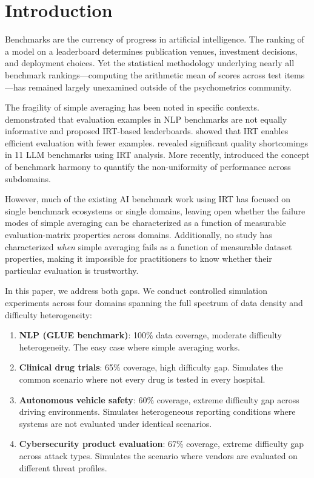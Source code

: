 \documentclass[11pt,a4paper]{article}
\begin{document}
\section{Introduction}

Benchmarks are the currency of progress in artificial intelligence. The ranking of a model on a leaderboard determines publication venues, investment decisions, and deployment choices. Yet the statistical methodology underlying nearly all benchmark rankings---computing the arithmetic mean of scores across test items---has remained largely unexamined outside of the psychometrics community.

The fragility of simple averaging has been noted in specific contexts. \citet{rodriguez2021} demonstrated that evaluation examples in NLP benchmarks are not equally informative and proposed IRT-based leaderboards. \citet{polo2024} showed that IRT enables efficient evaluation with fewer examples. \citet{zhou2025a} revealed significant quality shortcomings in 11 LLM benchmarks using IRT analysis. More recently, \citet{uzunoglu2025} introduced the concept of benchmark harmony to quantify the non-uniformity of performance across subdomains.

However, much of the existing AI benchmark work using IRT has focused on single benchmark ecosystems or single domains, leaving open whether the failure modes of simple averaging can be characterized as a function of measurable evaluation-matrix properties across domains. Additionally, no study has characterized \emph{when} simple averaging fails as a function of measurable dataset properties, making it impossible for practitioners to know whether their particular evaluation is trustworthy.

In this paper, we address both gaps. We conduct controlled simulation experiments across four domains spanning the full spectrum of data density and difficulty heterogeneity:

\begin{enumerate}
\item \textbf{NLP (GLUE benchmark)}: 100\% data coverage, moderate difficulty heterogeneity. The easy case where simple averaging works.
\item \textbf{Clinical drug trials}: 65\% coverage, high difficulty gap. Simulates the common scenario where not every drug is tested in every hospital.
\item \textbf{Autonomous vehicle safety}: 60\% coverage, extreme difficulty gap across driving environments. Simulates heterogeneous reporting conditions where systems are not evaluated under identical scenarios.
\item \textbf{Cybersecurity product evaluation}: 67\% coverage, extreme difficulty gap across attack types. Simulates the scenario where vendors are evaluated on different threat profiles.
\end{enumerate}
\end{document}
